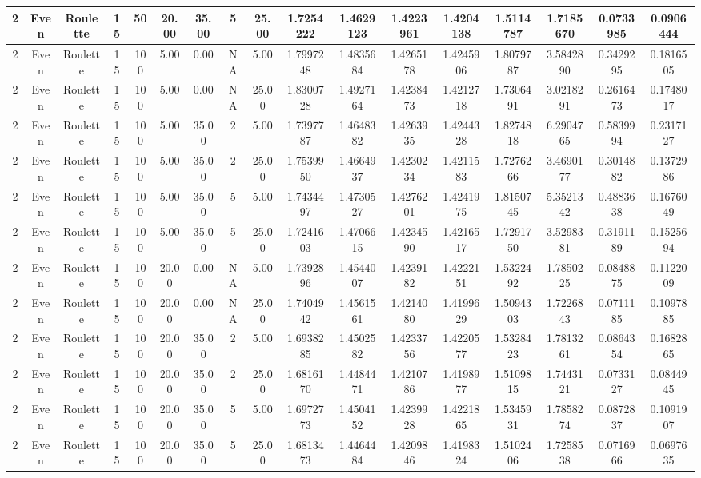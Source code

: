 \documentclass[a4paper]{article}
\begin{document}
\begin{center}
\begin{tabular}{ | c | c | c | c | c | c | c | c | c | c | c | c | c | c | c | c | c | }
		\hline
		2	&	Even	&	Roulette	&	15	&	50	&	20.00	&	35.00	&	5	&	25.00	&	1.7254222	&	1.4629123	&	1.4223961	&	1.4204138	&	1.5114787	&	1.7185670	&	0.0733985	&	0.0906444 \\
		\hline
		2	&	Even	&	Roulette	&	15	&	100	&	5.00	&	0.00	&	NA	&	5.00	&	1.7997248	&	1.4835684	&	1.4265178	&	1.4245906	&	1.8079787	&	3.5842890	&	0.3429295	&	0.1816505 \\
		\hline
		2	&	Even	&	Roulette	&	15	&	100	&	5.00	&	0.00	&	NA	&	25.00	&	1.8300728	&	1.4927164	&	1.4238473	&	1.4212718	&	1.7306491	&	3.0218291	&	0.2616473	&	0.1748017 \\
		\hline
		2	&	Even	&	Roulette	&	15	&	100	&	5.00	&	35.00	&	2	&	5.00	&	1.7397787	&	1.4648382	&	1.4263935	&	1.4244328	&	1.8274818	&	6.2904765	&	0.5839994	&	0.2317127 \\
		\hline
		2	&	Even	&	Roulette	&	15	&	100	&	5.00	&	35.00	&	2	&	25.00	&	1.7539950	&	1.4664937	&	1.4230234	&	1.4211583	&	1.7276266	&	3.4690177	&	0.3014882	&	0.1372986 \\
		\hline
		2	&	Even	&	Roulette	&	15	&	100	&	5.00	&	35.00	&	5	&	5.00	&	1.7434497	&	1.4730527	&	1.4276201	&	1.4241975	&	1.8150745	&	5.3521342	&	0.4883638	&	0.1676049 \\
		\hline
		2	&	Even	&	Roulette	&	15	&	100	&	5.00	&	35.00	&	5	&	25.00	&	1.7241603	&	1.4706615	&	1.4234590	&	1.4216517	&	1.7291750	&	3.5298381	&	0.3191189	&	0.1525694 \\
		\hline
		2	&	Even	&	Roulette	&	15	&	100	&	20.00	&	0.00	&	NA	&	5.00	&	1.7392896	&	1.4544007	&	1.4239182	&	1.4222151	&	1.5322492	&	1.7850225	&	0.0848875	&	0.1122009 \\
		\hline
		2	&	Even	&	Roulette	&	15	&	100	&	20.00	&	0.00	&	NA	&	25.00	&	1.7404942	&	1.4561561	&	1.4214080	&	1.4199629	&	1.5094303	&	1.7226843	&	0.0711185	&	0.1097885 \\
		\hline
		2	&	Even	&	Roulette	&	15	&	100	&	20.00	&	35.00	&	2	&	5.00	&	1.6938285	&	1.4502582	&	1.4233756	&	1.4220577	&	1.5328423	&	1.7813261	&	0.0864354	&	0.1682865 \\
		\hline
		2	&	Even	&	Roulette	&	15	&	100	&	20.00	&	35.00	&	2	&	25.00	&	1.6816170	&	1.4484471	&	1.4210786	&	1.4198977	&	1.5109815	&	1.7443121	&	0.0733127	&	0.0844945 \\
		\hline
		2	&	Even	&	Roulette	&	15	&	100	&	20.00	&	35.00	&	5	&	5.00	&	1.6972773	&	1.4504152	&	1.4239928	&	1.4221865	&	1.5345931	&	1.7858274	&	0.0872837	&	0.1091907 \\
		\hline
		2	&	Even	&	Roulette	&	15	&	100	&	20.00	&	35.00	&	5	&	25.00	&	1.6813473	&	1.4464484	&	1.4209846	&	1.4198324	&	1.5102406	&	1.7258538	&	0.0716966	&	0.0697635 \\

\end{tabular}
\end{center}
\end{document}
